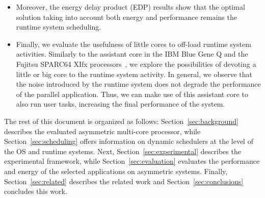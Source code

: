 \begin{itemize}
 \item Moreover, the energy delay product (EDP) results show that the optimal solution taking into account both energy and performance remains the runtime system scheduling.
 \item Finally, we evaluate the usefulness of little cores to off-load runtime system activities. Similarly to the assistant core in the IBM Blue Gene Q and the Fujitsu SPARC64 XIfx processors~\cite{BG-Q:HotChips2011, Fujitsu:HotChips2014}, we explore the possibilities of devoting a little or big core to the runtime system activity. In general, we observe that the noise introduced by the runtime system does not degrade the performance of the parallel application. Thus, we can make use of this assistant core to also run user tasks, increasing the final performance of the system.
\end{itemize}

The rest of this document is organized as follows: Section~\ref{sec:background} describes the evaluated asymmetric multi-core processor, while Section~\ref{sec:scheduling} offers information on dynamic schedulers at the level of the OS and runtime systems. Next, Section~\ref{sec:experimental} describes the experimental framework, while Section~\ref{sec:evaluation} evaluates the performance and energy of the selected applications on asymmetric systems. Finally, Section~\ref{sec:related} describes the related work and Section~\ref{sec:conclusions} concludes this work. 

 

